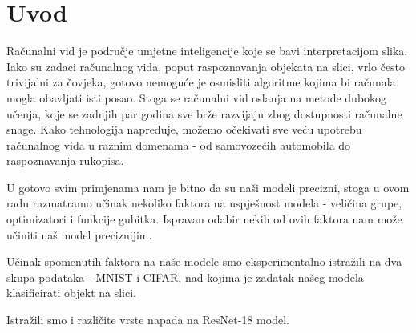\chapter{Uvod}

Računalni vid je područje umjetne inteligencije koje se bavi interpretacijom slika. Iako su zadaci računalnog vida, poput raspoznavanja objekata na slici, vrlo često trivijalni za čovjeka, gotovo nemoguće je osmisliti algoritme kojima bi računala mogla obavljati isti posao. Stoga se računalni vid oslanja na metode dubokog učenja, koje se zadnjih par godina sve brže razvijaju zbog dostupnosti računalne snage. Kako tehnologija napreduje, možemo očekivati sve veću upotrebu računalnog vida u raznim domenama - od samovozećih automobila do raspoznavanja rukopisa. 

U gotovo svim primjenama nam je bitno da su naši modeli precizni, stoga u ovom radu razmatramo učinak nekoliko faktora na uspješnost modela - veličina grupe, optimizatori i funkcije gubitka. Ispravan odabir nekih od ovih faktora nam može učiniti naš model preciznijim.

Učinak spomenutih faktora na naše modele smo eksperimentalno istražili na dva skupa podataka - MNIST i CIFAR, nad kojima je zadatak našeg modela klasificirati objekt na slici. 

Istražili smo i različite vrste napada na ResNet-18 model.